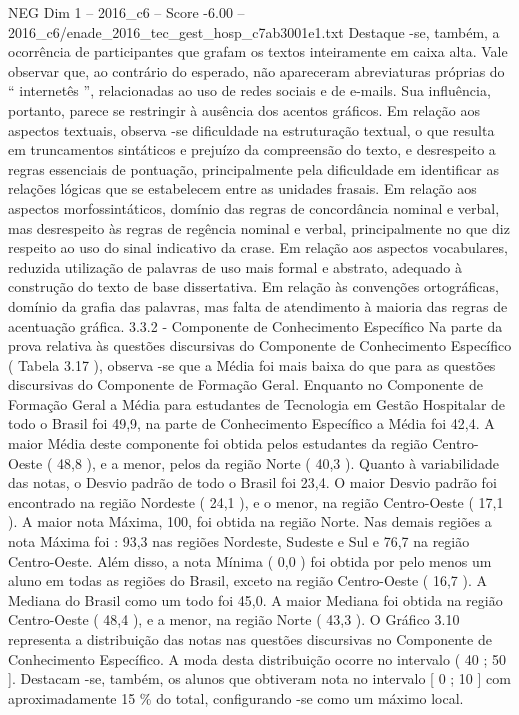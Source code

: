 \begin{textsample}{NEG Dim 1 – 2016\_c6 – Score -6.00 – 2016\_c6/enade\_2016\_tec\_gest\_hosp\_c7ab3001e1.txt}
Destaque -se, também, a ocorrência de participantes que grafam os textos inteiramente em caixa alta.
Vale observar que, ao contrário do esperado, não apareceram abreviaturas próprias do “ internetês ”, relacionadas ao uso de redes sociais e de e-mails.
Sua influência, portanto, parece se restringir à ausência dos acentos gráficos.
Em relação aos aspectos textuais, observa -se dificuldade na estruturação textual, o que resulta em truncamentos sintáticos e prejuízo da compreensão do texto, e desrespeito a regras essenciais de pontuação, principalmente pela dificuldade em identificar as relações lógicas que se estabelecem entre as unidades frasais.
Em relação aos aspectos morfossintáticos, domínio das regras de concordância nominal e verbal, mas desrespeito às regras de regência nominal e verbal, principalmente no que diz respeito ao uso do sinal indicativo da crase.
Em relação aos aspectos vocabulares, reduzida utilização de palavras de uso mais formal e abstrato, adequado à construção do texto de base dissertativa.
Em relação às convenções ortográficas, domínio da grafia das palavras, mas falta de atendimento à maioria das regras de acentuação gráfica. 3.3.2 - Componente de Conhecimento Específico Na parte da prova relativa às questões discursivas do Componente de Conhecimento Específico ( Tabela 3.17 ), observa -se que a Média foi mais baixa do que para as questões discursivas do Componente de Formação Geral.
Enquanto no Componente de Formação Geral a Média para estudantes de Tecnologia em Gestão Hospitalar de todo o Brasil foi 49,9, na parte de Conhecimento Específico a Média foi 42,4.
A maior Média deste componente foi obtida pelos estudantes da região Centro-Oeste ( 48,8 ), e a menor, pelos da região Norte ( 40,3 ).
Quanto à variabilidade das notas, o Desvio padrão de todo o Brasil foi 23,4.
O maior Desvio padrão foi encontrado na região Nordeste ( 24,1 ), e o menor, na região Centro-Oeste ( 17,1 ).
A maior nota Máxima, 100, foi obtida na região Norte.
Nas demais regiões a nota Máxima foi : 93,3 nas regiões Nordeste, Sudeste e Sul e 76,7 na região Centro-Oeste.
Além disso, a nota Mínima ( 0,0 ) foi obtida por pelo menos um aluno em todas as regiões do Brasil, exceto na região Centro-Oeste ( 16,7 ).
A Mediana do Brasil como um todo foi 45,0.
A maior Mediana foi obtida na região Centro-Oeste ( 48,4 ), e a menor, na região Norte ( 43,3 ).
O Gráfico 3.10 representa a distribuição das notas nas questões discursivas no Componente de Conhecimento Específico.
A moda desta distribuição ocorre no intervalo ( 40 ; 50 ].
Destacam -se, também, os alunos que obtiveram nota no intervalo [ 0 ; 10 ] com aproximadamente 15 \% do total, configurando -se como um máximo local.

\end{textsample}
